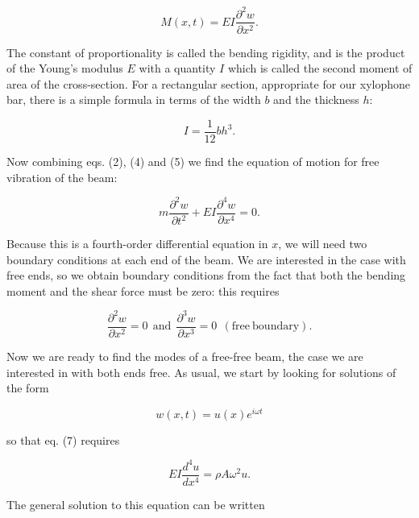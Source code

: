   \begin{equation*}M(x,t) = EI\dfrac{\partial^2 w}{\partial x^2} . 
  \tag{5}\end{equation*} 

  The constant of proportionality is called the bending rigidity, and is the 
  product of the Young's modulus $E$ with a quantity $I$ which is called the 
  second moment of area of the cross-section. For a rectangular section, 
  appropriate for our xylophone bar, there is a simple formula in terms of the 
  width $b$ and the thickness $h$: 

  \begin{equation*}I=\dfrac{1}{12} bh^3. \tag{6}\end{equation*} 

  Now combining eqs. (2), (4) and (5) we find the equation of motion for free 
  vibration of the beam: 

  \begin{equation*}m \dfrac{\partial^2 w}{\partial t^2}+EI \dfrac{\partial^4 
  w}{\partial x^4}=0 . \tag{7}\end{equation*} 

  Because this is a fourth-order differential equation in $x$, we will need two 
  boundary conditions at each end of the beam. We are interested in the case 
  with free ends, so we obtain boundary conditions from the fact that both the 
  bending moment and the shear force must be zero: this requires 

  \begin{equation*}\dfrac{\partial^2 w}{\partial x^2}=0 \mathrm{~~and~~} 
  \dfrac{\partial^3 w}{\partial x^3}=0~~\mathrm{(free~boundary).} 
  \tag{8}\end{equation*} 

  Now we are ready to find the modes of a free-free beam, the case we are 
  interested in with both ends free. As usual, we start by looking for 
  solutions of the form 

  \begin{equation*}w(x,t) = u(x) e^{i \omega t} \tag{9}\end{equation*} 

  \noindent{}so that eq. (7) requires 

  \begin{equation*}EI\dfrac{d^4 u}{d x^4}= \rho A \omega^2 u. 
  \tag{10}\end{equation*} 

  The general solution to this equation can be written 

